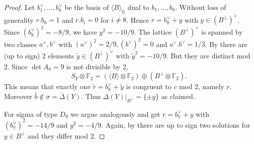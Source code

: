 \documentclass[a4paper]{amsart}
\theoremstyle{definition}
\theoremstyle{plain}
\newcommand{\QQ}{\mathbb{Q}}
\newcommand{\FF}{\mathbb{F}}
\newcommand{\DeltabarY}{\overline{\Delta}(Y)}
\begin{document}
\begin{proof}
Let $b_1^\vee, \dots,b_8^\vee$ be the basis of $\langle B \rangle_{\QQ}$ dual to $b_1,\dots,b_8$.
Without loss of generality $r.b_8=1$ and $r.b_i=0$ for $i\neq 8$. Hence $r = b_8^\vee+y$ with $y \in (B^\perp)^\vee$. Since $(b_8^\vee)^2=-8/9$, we have $y^2=-10/9$. The lattice $(B^\perp)^\vee$ is spanned by two classes $a^\vee,b^\vee$ with $(a^\vee)^2=2/9, (b^\vee)^2=0$ and $a^\vee.b^\vee=1/3$.
By  there are (up to sign) $2$ elements $\widetilde{y} \in \left(B^\perp\right)^\vee$ with $\widetilde{y}^2=-10/9$. But they are distinct mod $2$. Since $\det A_8=9$ is not divisible by $2$,
\[S_Y \otimes \FF_2 = \left(\langle B \rangle \otimes \FF_2\right) \oplus \left(B^\perp \otimes \FF_2\right).\]
This means that exactly one $\widetilde{r}=b_8^\vee + \widetilde{y}$ is congruent to $c$ mod $2$, namely $r$. Moreover $\bar b\notin \sigma=\DeltabarY$.
Thus $\Delta(Y)|_{B^\perp}=\{\pm y\}$ as claimed.

For sigma of type $D_9$ we argue analogously and get $r = b_7^\vee+ y$ with $(b_7^\vee)^2=-14/9$ and $y^2=-4/9$.
Again, by  there are up to sign two solutions for $y \in B^\perp$ and they differ mod $2$.
\end{proof}
\end{document}
